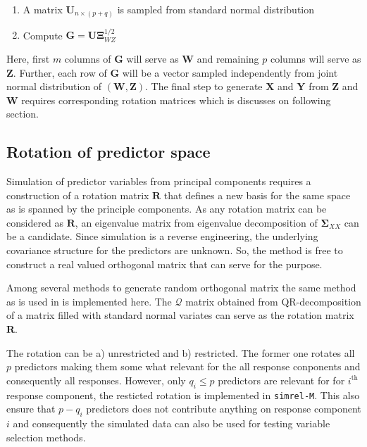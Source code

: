 \documentclass[12pt,A4paper,authoryear]{elsarticle} %
\providecommand{\tightlist}{%
  \setlength{\itemsep}{0pt}\setlength{\parskip}{0pt}}
\begin{document}
\begin{enumerate}
\def\labelenumi{\arabic{enumi})}
\tightlist
\item
  A matrix \(\mathbf{U}_{n\times (p + q)}\) is sampled from standard
  normal distribution
\item
  Compute \(\mathbf{G} = \boldsymbol{U\Xi}_{WZ}^{1/2}\)
\end{enumerate}

Here, first \(m\) columns of \(\mathbf{G}\) will serve as \(\mathbf{W}\)
and remaining \(p\) columns will serve as \(\mathbf{Z}\). Further, each
row of \(\mathbf{G}\) will be a vector sampled independently from joint
normal distribution of \(\left(\mathbf{W}, \mathbf{Z}\right)\). The
final step to generate \(\mathbf{X}\) and \(\mathbf{Y}\) from
\(\mathbf{Z}\) and \(\mathbf{W}\) requires corresponding rotation
matrices which is discusses on following section.

\subsection{Rotation of predictor space}\label{rotation-predictor-space}

Simulation of predictor variables from principal components requires a
construction of a rotation matrix \(\mathbf{R}\) that defines a new
basis for the same space as is spanned by the principle components. As
any rotation matrix can be considered as \(\mathbf{R}\), an eigenvalue
matrix from eigenvalue decomposition of \(\boldsymbol{\Sigma}_{XX}\) can
be a candidate. Since simulation is a reverse engineering, the
underlying covariance structure for the predictors are unknown. So, the
method is free to construct a real valued orthogonal matrix that can
serve for the purpose.

Among several methods
\citep{anderson1987generation, heiberger1978algorithm} to generate
random orthogonal matrix the same method as is used in
\citet{saebo2015simrel} is implemented here. The \(\mathcal{Q}\) matrix
obtained from QR-decomposition of a matrix filled with standard normal
variates can serve as the rotation matrix \(\mathbf{R}\).

The rotation can be a) unrestricted and b) restricted. The former one
rotates all \(p\) predictors making them some what relevant for the all
response conponents and consequently all responses. However, only
\(q_i \le p\) predictors are relevant for for \(i^\text{th}\) response
component, the resticted rotation is implemented in \texttt{simrel-M}.
This also ensure that \(p-q_i\) predictors does not contribute anything
on response component \(i\) and consequently the simulated data can also
be used for testing variable selection methods.
\end{document}
